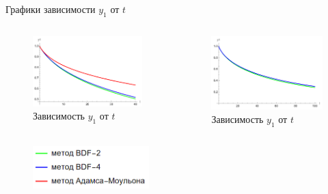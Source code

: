 \documentclass[ignoreonframetext,unicode]{beamer}
\begin{document}
\begin{frame}{Графики зависимости $y_1$ от $t$}
	\begin{columns}
		
	\begin{figure}[!htbp]
		\centering
		\includegraphics[width=1\textwidth]{T40-1}%
		\caption{Зависимость $y_1$ от $t$}
		\vspace*{-2mm}
		\label{T40-1}
	\end{figure}

	\begin{figure}[!htbp]
		\centering
		\includegraphics[width=1\textwidth]{T100-1}%
		\caption{Зависимость $y_1$ от $t$}
		\vspace*{-2mm}
		\label{T100-1}
	\end{figure}
	\end{columns}

	\begin{figure}[!htbp]
		\centering
		\includegraphics[width=0.4\textwidth]{graph-legend}%
	\end{figure}

\end{frame}
\end{document}
